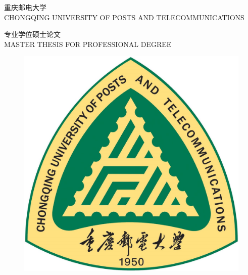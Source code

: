 \quad
\vspace{-3mm}

\begin{center}



\erhaod 重\hspace{11pt}庆\hspace{11pt}邮\hspace{11pt}电\hspace{11pt}大\hspace{11pt}学\\[1mm]
\xiaosid CHONGQING UNIVERSITY OF POSTS AND TELECOMMUNICATIONS\\
\vspace{14mm}

\chuhaod 专业学位硕士论文\\[2mm]
\sanhaod MASTER THESIS FOR PROFESSIONAL DEGREE




\vspace{13mm}

        
        \begin{figure}[h]
        	\centering
        	\includegraphics[scale=0.475]{chapters/logo2.jpg}
        \end{figure}
\end{center}

